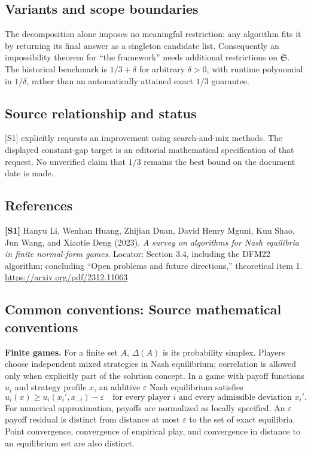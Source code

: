 \documentclass[11pt,a4paper]{article}
\begin{document}
\subsection*{Variants and scope boundaries}
The decomposition alone imposes no meaningful restriction: any algorithm fits it by returning its final answer as a singleton candidate list. Consequently an impossibility theorem for ``the framework'' needs additional restrictions on $\mathfrak S$. The historical benchmark is $1/3+\delta$ for arbitrary $\delta>0$, with runtime polynomial in $1/\delta$, rather than an automatically attained exact $1/3$ guarantee.
\subsection*{Source relationship and status}
[S1] explicitly requests an improvement using search-and-mix methods. The displayed constant-gap target is an editorial mathematical specification of that request. No unverified claim that $1/3$ remains the best bound on the document date is made.
\subsection*{References}
\begingroup\footnotesize\raggedright
{\footnotesize\raggedright
\textbf{[S1]} Hanyu Li, Wenhan Huang, Zhijian Duan, David Henry Mguni, Kun Shao, Jun Wang, and Xiaotie Deng (2023). \emph{A survey on algorithms for Nash equilibria in finite normal-form games}. Locator: Section 3.4, including the DFM22 algorithm; concluding ``Open problems and future directions,'' theoretical item 1. \url{https://arxiv.org/pdf/2312.11063}\par}
\par\endgroup

\subsection*{Common conventions: Source mathematical conventions}

\textbf{Finite games.} For a finite set $A$, $\Delta(A)$ is its probability
simplex. Players choose independent mixed strategies in Nash equilibrium;
correlation is allowed only when explicitly part of the solution concept.
In a game with payoff functions $u_i$ and strategy profile $x$, an additive
$\varepsilon$ Nash equilibrium satisfies
\[
 u_i(x)\geq u_i(x_i',x_{-i})-\varepsilon
 \quad\text{for every player $i$ and every admissible deviation $x_i'$}.
\]
For numerical approximation, payoffs are normalized as locally specified.
An $\varepsilon$ payoff residual is distinct from distance at most
$\varepsilon$ to the set of exact equilibria. Point convergence, convergence
of empirical play, and convergence in distance to an equilibrium set are
also distinct.
\end{document}
